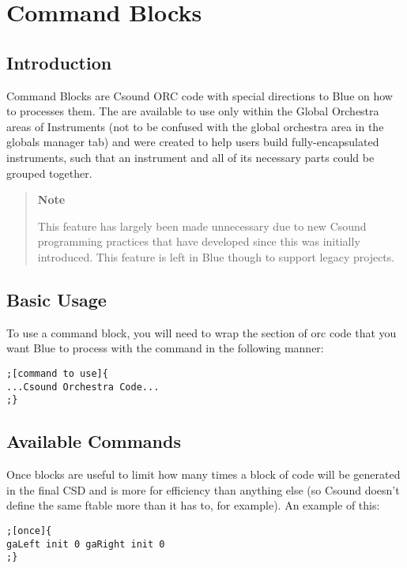 \section{Command Blocks}\label{commandBlocks}

\subsection{Introduction}

Command Blocks are Csound ORC code with special directions to Blue on
how to processes them. The are available to use only within the Global
Orchestra areas of Instruments (not to be confused with the global
orchestra area in the globals manager tab) and were created to help
users build fully-encapsulated instruments, such that an instrument and
all of its necessary parts could be grouped together.

\begin{quote}
\textbf{Note}

This feature has largely been made unnecessary due to new Csound
programming practices that have developed since this was initially
introduced. This feature is left in Blue though to support legacy
projects.
\end{quote}

\subsection{Basic Usage}

To use a command block, you will need to wrap the section of orc code
that you want Blue to process with the command in the following manner:

\begin{verbatim}
;[command to use]{ 
...Csound Orchestra Code... 
;}
\end{verbatim}

\subsection{Available Commands}

Once blocks are useful to limit how many times a block of code will be
generated in the final CSD and is more for efficiency than anything else
(so Csound doesn't define the same ftable more than it has to, for
example). An example of this:

\begin{verbatim}
;[once]{ 
gaLeft init 0 gaRight init 0 
;}
\end{verbatim}

